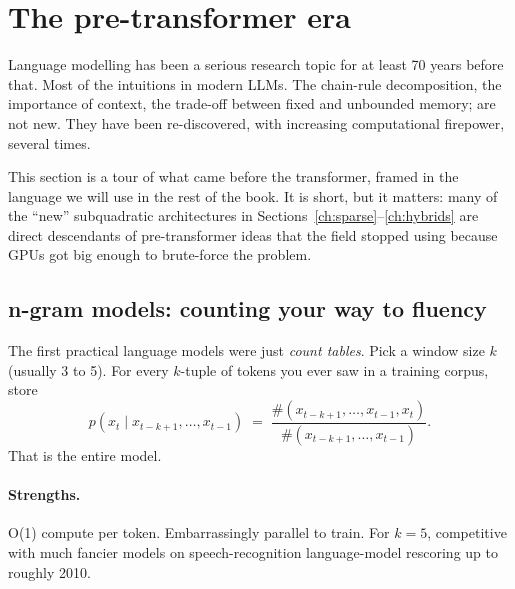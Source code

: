 \section{The pre-transformer era}
\label{ch:pre-transformer}

 Language modelling has been a
serious research topic for at least 70 years before that. Most of the
intuitions in modern LLMs. The chain-rule decomposition, the importance of
context, the trade-off between fixed and unbounded memory; are not new. They
have been re-discovered, with increasing computational firepower, several
times.

This section is a tour of what came before the transformer, framed in the
language we will use in the rest of the book. It is short, but it matters:
many of the ``new'' subquadratic architectures in Sections~\ref{ch:sparse}--\ref{ch:hybrids} are direct
descendants of pre-transformer ideas that the field stopped using because
GPUs got big enough to brute-force the problem.

\subsection{n-gram models: counting your way to fluency}

The first practical language models were just \emph{count tables}. Pick a
window size \(k\) (usually 3 to 5). For every \(k\)-tuple of tokens you ever
saw in a training corpus, store
\begin{equation}
  p(x_t \mid x_{t-k+1}, \ldots, x_{t-1})
  \;=\;
  \frac{\#(x_{t-k+1}, \ldots, x_{t-1}, x_t)}
       {\#(x_{t-k+1}, \ldots, x_{t-1})}.
  \label{eq:ngram}
\end{equation}
That is the entire model.

\paragraph{Strengths.} O(1) compute per token. Embarrassingly parallel to
train. For \(k = 5\), competitive with much fancier models on speech-recognition
language-model rescoring up to roughly 2010.

